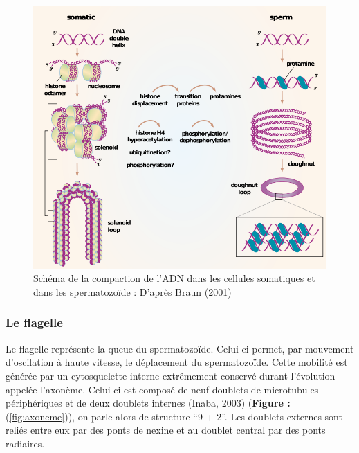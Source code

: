 \documentclass[12pt,twoside]{reedthesis}
\theoremstyle{definition}
\theoremstyle{definition}
\theoremstyle{remark}
\begin{document}
  \begin{figure}
  
  {\centering \includegraphics[scale=.55]{figure/noyau} 
  
  }
  
  \caption[Schéma de la compaction de l’ADN dans les cellules somatiques et dans les
  spermatozoïde]{Schéma de la compaction de l’ADN dans les cellules somatiques et dans les
  spermatozoïde : D'après Braun (2001)}\label{fig:noyau}
  \end{figure}
  
  \subsubsection{Le flagelle}\label{le-flagelle}
  
  Le flagelle représente la queue du spermatozoïde. Celui-ci permet, par
  mouvement d'oscilation à haute vitesse, le déplacement du spermatozoïde.
  Cette mobilité est générée par un cytosquelette interne extrêmement
  conservé durant l'évolution appelée l'axonème. Celui-ci est composé de
  neuf doublets de microtubules périphériques et de deux doublets internes
  (Inaba, 2003) (\textbf{Figure : }(\ref{fig:axoneme})), on parle alors de
  structure ``9 + 2''. Les doublets externes sont reliés entre eux par des
  ponts de nexine et au doublet central par des ponts radiaires.
  
\end{document}
